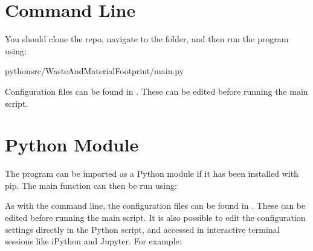 \documentclass[letterpaper,10pt,english]{sphinxmanual}
\begin{document}
\section{Command Line}
\label{\detokenize{usage:command-line}}
\sphinxAtStartPar
You should clone the repo, navigate to the  folder, and then run the program using:

\begin{sphinxVerbatim}[commandchars=\\\{\}]
pythonsrc/WasteAndMaterialFootprint/main.py
\end{sphinxVerbatim}

\sphinxAtStartPar
Configuration files can be found in . These can be edited before running the main script.


\section{Python Module}
\label{\detokenize{usage:python-module}}
\sphinxAtStartPar
The program can be imported as a Python module if it has been installed with pip. The main function can then be run using:

\begin{sphinxVerbatim}[commandchars=\\\{\}]
   
\end{sphinxVerbatim}

\sphinxAtStartPar
As with the command line, the configuration files can be found in . These can be edited before running the main script.
It is also possible to edit the configuration settings directly in the Python script, and accessed in interactive terminal sessions like iPython and Jupyter.
For example:
\end{document}
